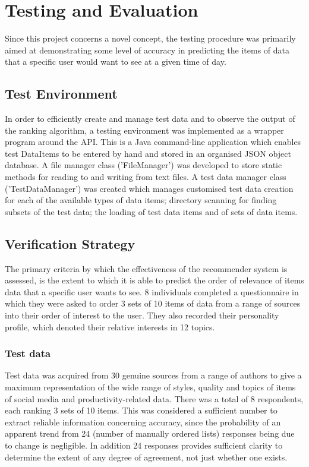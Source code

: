\chapter{Testing and Evaluation}

Since this project concerns a novel concept, the testing procedure was primarily aimed at demonstrating some level of accuracy in predicting the items of data that a specific user would want to see at a given time of day.

\section{Test Environment}

In order to efficiently create and manage test data and to observe the output of the ranking algorithm, a testing environment was implemented as a wrapper program around the API. This is a Java command-line application which enables test DataItems to be entered by hand and stored in an organised JSON object database.
A file manager class ('FileManager') was developed to store static methods for reading to and writing from text files. A test data manager class ('TestDataManager') was created which manages customised test data creation for each of the available types of data items; directory scanning for finding subsets of the test data; the loading of test data items and of sets of data items.

\section{Verification Strategy}

The primary criteria by which the effectiveness of the recommender system is assessed, is the extent to which it is able to predict the order of relevance of items data that a specific user wants to see. 8 individuals completed a questionnaire in which they were asked to order 3 sets of 10 items of data from a range of sources into their order of interest to the user. They also recorded their personality profile, which denoted their relative interests in 12 topics. 

\subsection{Test data}

Test data was acquired from 30 genuine sources from a range of authors to give a maximum representation of the wide range of styles, quality and topics of items of social media and productivity-related data. There was a total of 8 respondents, each ranking 3 sets of 10 items. This was considered a sufficient number to extract reliable information concerning accuracy, since the probability of an apparent trend from 24 (number of manually ordered lists) responses being due to change is negligible. In addition 24 responses provides sufficient clarity to determine the extent of any degree of agreement, not just whether one exists. 

